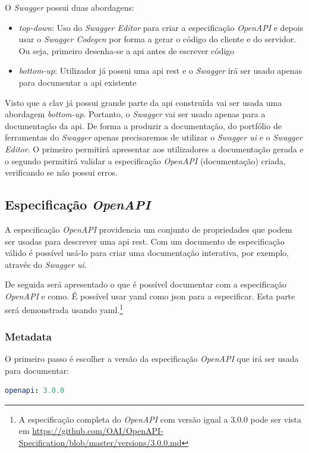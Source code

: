 O \textit{Swagger} possui duas abordagens:~\cite{swaggerNode}
\begin{itemize}
    \item \textit{top-down}: Uso do \textit{Swagger Editor} para criar a especificação \textit{OpenAPI} e depois usar o \textit{Swagger Codegen} por forma a gerar o código do cliente e do servidor. Ou seja, primeiro desenha-se a \acrshort{api} antes de escrever código
    \item \textit{bottom-up}: Utilizador já possui uma \acrshort{api} \acrshort{rest} e o \textit{Swagger} irá ser usado apenas para documentar a \acrshort{api} existente
\end{itemize}

Visto que a \acrshort{clav} já possui grande parte da \acrshort{api} construída vai ser usada uma abordagem \textit{bottom-up}. Portanto, o \textit{Swagger} vai ser usado apenas para a documentação da \acrshort{api}. De forma a produzir a documentação, do portfólio de ferramentas do \textit{Swagger} apenas precisaremos de utilizar o \textit{Swagger \acrshort{ui}} e o \textit{Swagger Editor}. O primeiro permitirá apresentar aos utilizadores a documentação gerada e o segundo permitirá validar a especificação \textit{OpenAPI} (documentação) criada, verificando se não possui erros.

\subsection{Especificação \textit{OpenAPI}}

A especificação \textit{OpenAPI} providencia um conjunto de propriedades que podem ser usadas para descrever uma \acrshort{api} \acrshort{rest}. Com um documento de especificação válido é possível usá-lo para criar uma documentação interativa, por exemplo, através do \textit{Swagger \acrshort{ui}}.

De seguida será apresentado o que é possível documentar com a especificação \textit{OpenAPI} e como. É possível usar \acrshort{yaml} como \acrshort{json} para a especificar. Esta parte será demonstrada usando \acrshort{yaml}.\footnote{A especificação completa do \textit{OpenAPI} com versão igual a 3.0.0 pode ser vista em \url{https://github.com/OAI/OpenAPI-Specification/blob/master/versions/3.0.0.md}}

\subsubsection{Metadata}
O primeiro passo é escolher a versão da especificação \textit{OpenAPI} que irá ser usada para documentar:
\begin{lstlisting}[language=yaml, caption=Exemplo de indicação da versão da especificação \textit{OpenAPI}]
openapi: 3.0.0
\end{lstlisting}

